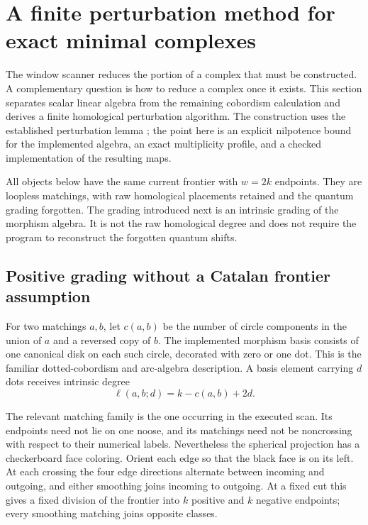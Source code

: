 \section{A finite perturbation method for exact minimal complexes}
\label{sec:perturbation-theory}

The window scanner reduces the portion of a complex that must be
constructed.  A complementary question is how to reduce a complex once it
exists.  This section separates scalar linear algebra from the remaining
cobordism calculation and derives a finite homological perturbation
algorithm.  The construction uses the established perturbation lemma
\cite{crainic}; the point here is an explicit nilpotence bound for the
implemented algebra, an exact multiplicity profile, and a checked
implementation of the resulting maps.

All objects below have the same current frontier with $w=2k$ endpoints.
They are loopless matchings, with raw homological placements retained and
the quantum grading forgotten.  The grading introduced next is an
intrinsic grading of the morphism algebra.  It is not the raw homological
degree and does not require the program to reconstruct the forgotten
quantum shifts.

\subsection{Positive grading without a Catalan frontier assumption}

For two matchings $a,b$, let $c(a,b)$ be the number of circle components in
the union of $a$ and a reversed copy of $b$.  The implemented morphism
basis consists of one canonical disk on each such circle, decorated with
zero or one dot.  This is the familiar dotted-cobordism and arc-algebra
description\cite{barnatan,khovanov_arc}.  A basis element carrying $d$
dots receives intrinsic degree
\begin{equation}
 \ell(a,b;d)=k-c(a,b)+2d.
 \label{eq:intrinsic-degree}
\end{equation}

The relevant matching family is the one occurring in the executed scan.
Its endpoints need not lie on one noose, and its matchings need not be
noncrossing with respect to their numerical labels.  Nevertheless the
spherical projection has a checkerboard face coloring.  Orient each edge
so that the black face is on its left.  At each crossing the four edge
directions alternate between incoming and outgoing, and either smoothing
joins incoming to outgoing.  At a fixed cut this gives a fixed division of
the frontier into $k$ positive and $k$ negative endpoints; every smoothing
matching joins opposite classes.

